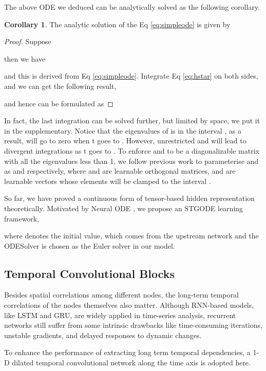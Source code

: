 \documentclass[sigconf]{acmart}
\theoremstyle{definition}
\newtheorem{corollary}{Corollary}
\begin{document}
The above ODE we deduced can be analytically solved as the following corollary.
\begin{corollary}
  The analytic solution of the Eq \ref{eq:simpleode} is given by
  
\end{corollary}
\begin{proof}
  Suppose
  
  then we have
  
  and this is derived from  Eq \ref{eq:simpleode}. Integrate Eq \ref{eq:hstar} on both sides, and we can get the following result,
  
  and hence  can be formulated as
  
\end{proof}
In fact, the last integration can be solved further, but limited by space, we put it in the supplementary.
Notice that the eigenvalues of  is in the interval , as a result,  will go to zero when t goes to . However, unrestricted  and  will lead to divergent integrations as t goes to . To enforce  and  to be a diagonalizable matrix with all the eigenvalues less than 1, we follow previous work \cite{cisse2017parseval} to parameterise  and  as  and  respectively, where  and  are learnable orthogonal matrices,  and  are learnable vectors whose elements will be clamped to the interval .

So far, we have proved a continuous form of tensor-based hidden representation theoretically. Motivated by Neural ODE \cite{chen2018neural}, we propose an STGODE learning framework,

where 
 denotes the initial value, which comes from the upstream network and the ODESolver is chosen as the Euler solver in our model.


\subsection{Temporal Convolutional Blocks}
Besides spatial correlations among different nodes, the long-term temporal correlations of the nodes themselves also matter.
Although RNN-based models, like LSTM and GRU, are widely applied in time-series analysis, recurrent networks still suffer from some intrinsic drawbacks like time-consuming iterations, unstable gradients, and delayed responses to dynamic changes.

To enhance the performance of extracting long term temporal dependencies, a 1-D dilated temporal convolutional network along the time axis is adopted here.
\end{document}
